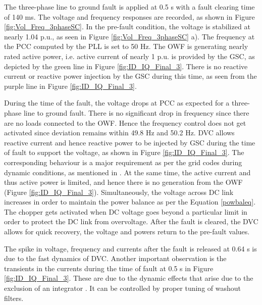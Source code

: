 The three-phase line to ground fault is applied at 0.5 s with a fault clearing time of 140 ms. The voltage and frequency responses are recorded, as shown in Figure \ref{fig:Vol_Freq_3phaseSC}. In the pre-fault condition, the voltage is stabilized at nearly 1.04 p.u., as seen in Figure \ref{fig:Vol_Freq_3phaseSC} a). 
The frequency at the \gls{PCC} computed by the \gls{PLL} is set to 50 Hz.
The \gls{OWF} is generating nearly rated active power, i.e. active current of nearly 1 p.u. is provided by the \gls{GSC}, as depicted by the green line in Figure \ref{fig:ID_IQ_Final_3}. There is no reactive current or reactive power injection by the \gls{GSC} during this time, as seen from the purple line in Figure \ref{fig:ID_IQ_Final_3}. 

During the time of the fault, the voltage drops at \gls{PCC} as expected for a three-phase line to ground fault. There is no significant drop in frequency since there are no loads connected to the \gls{OWF}. Hence the frequency control does not get activated since deviation remains within 49.8 Hz and 50.2 Hz.
\gls{DVC} allows reactive current and hence reactive power to be injected by \gls{GSC} during the time of fault to support the voltage, as shown in Figure \ref{fig:ID_IQ_Final_3}. The corresponding behaviour is a major requirement as per the grid codes during dynamic conditions, as mentioned in \cite{mohseni_review_2012}. At the same time, the active current and thus active power is limited, and hence there is no generation from the \gls{OWF} (Figure \ref{fig:ID_IQ_Final_3}). Simultaneously, the voltage across \gls{DC} link increases in order to maintain the power balance as per the Equation \ref{powbaleq}. The chopper gets activated when \gls{DC} voltage goes beyond a particular limit in order to protect the \gls{DC} link from overvoltage. After the fault is cleared, the \gls{DVC} allows for quick recovery, the voltage and powers return to the pre-fault values. 

The spike in voltage, frequency and currents after the fault is released at 0.64 s is due to the fast dynamics of \gls{DVC}. Another important observation is the transients in the currents during the time of fault at 0.5 s in Figure \ref{fig:ID_IQ_Final_3}. These are due to the dynamic effects that arise due to the exclusion of an integrator \cite{korai_dynamic_2019}. It can be controlled by proper tuning of washout filters.

